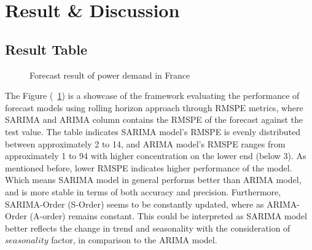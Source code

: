 \documentclass[acmtog]{acmart}
\begin{document}
\section{Result \& Discussion}

\subsection{Result Table}
\begin{figure}[hbt!]
    \centering
    \caption{Forecast result of power demand in France}
    \label{fig:forecast_result}
\end{figure}

The Figure (~\ref{fig:forecast_result}) is a showcase of the framework evaluating the performance of forecast models using rolling horizon approach through RMSPE metrics, where SARIMA and ARIMA column contains the RMSPE of the forecast against the test value. The table indicates SARIMA model's RMSPE is evenly distributed between approximately 2 to 14, and ARIMA model's RMSPE ranges from approximately 1 to 94 with higher concentration on the lower end (below 3). As mentioned before, lower RMSPE indicates higher performance of the model. Which means SARIMA model in general performs better than ARIMA model, and is more stable in terms of both accuracy and precision. Furthermore, SARIMA-Order (S-Order) seems to be constantly updated, where as ARIMA-Order (A-order) remains constant. This could be interpreted as SARIMA model better reflects the change in trend and seasonality with the consideration of ${seasonality}$ factor, in comparison to the ARIMA model. \\
\end{document}
